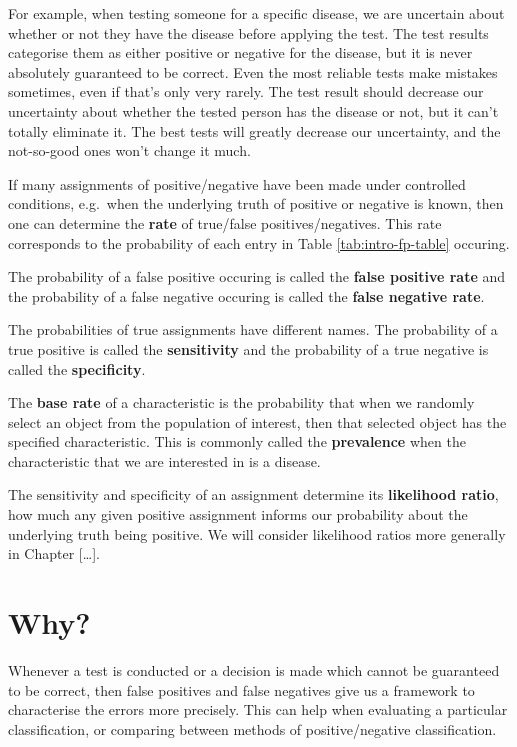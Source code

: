 \documentclass[
]{book}
\begin{document}
For example, when testing someone for a specific disease, we are uncertain about whether or not they have the disease before applying the test. The test results categorise them as either positive or negative for the disease, but it is never absolutely guaranteed to be correct. Even the most reliable tests make mistakes sometimes, even if that's only very rarely. The test result should decrease our uncertainty about whether the tested person has the disease or not, but it can't totally eliminate it. The best tests will greatly decrease our uncertainty, and the not-so-good ones won't change it much.

If many assignments of positive/negative have been made under controlled conditions, e.g.~when the underlying truth of positive or negative is known, then one can determine the \textbf{rate} of true/false positives/negatives. This rate corresponds to the probability of each entry in Table \ref{tab:intro-fp-table} occuring.

The probability of a false positive occuring is called the \textbf{false positive rate} and the probability of a false negative occuring is called the \textbf{false negative rate}.

The probabilities of true assignments have different names. The probability of a true positive is called the \textbf{sensitivity} and the probability of a true negative is called the \textbf{specificity}.

The \textbf{base rate} of a characteristic is the probability that when we randomly select an object from the population of interest, then that selected object has the specified characteristic. This is commonly called the \textbf{prevalence} when the characteristic that we are interested in is a disease.

The sensitivity and specificity of an assignment determine its \textbf{likelihood ratio}, how much any given positive assignment informs our probability about the underlying truth being positive. We will consider likelihood ratios more generally in Chapter {[}\ldots{]}.

\hypertarget{why}{%
\section{Why?}\label{why}}

Whenever a test is conducted or a decision is made which cannot be guaranteed to be correct, then false positives and false negatives give us a framework to characterise the errors more precisely. This can help when evaluating a particular classification, or comparing between methods of positive/negative classification.
\end{document}
